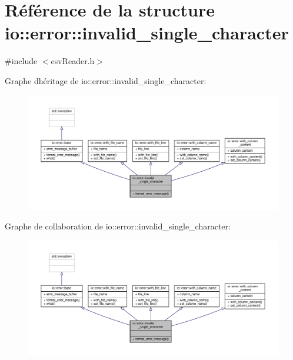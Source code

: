 \hypertarget{structio_1_1error_1_1invalid__single__character}{}\section{Référence de la structure io\+:\+:error\+:\+:invalid\+\_\+single\+\_\+character}
\label{structio_1_1error_1_1invalid__single__character}


{\ttfamily \#include $<$csv\+Reader.\+h$>$}



Graphe d\textquotesingle{}héritage de io\+:\+:error\+:\+:invalid\+\_\+single\+\_\+character\+:\nopagebreak
\begin{figure}[H]
\begin{center}
\leavevmode
\includegraphics[width=350pt]{structio_1_1error_1_1invalid__single__character__inherit__graph}
\end{center}
\end{figure}


Graphe de collaboration de io\+:\+:error\+:\+:invalid\+\_\+single\+\_\+character\+:\nopagebreak
\begin{figure}[H]
\begin{center}
\leavevmode
\includegraphics[width=350pt]{structio_1_1error_1_1invalid__single__character__coll__graph}
\end{center}
\end{figure}
